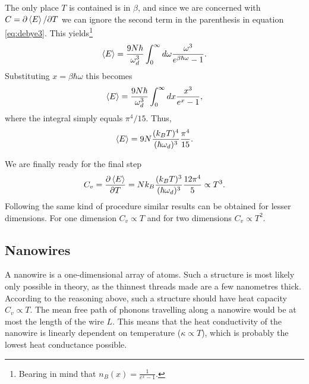 \documentclass[11pt]{amsart}
\begin{document}
The only place $T$ is contained is in $\beta$, and since we are concerned with $C = \partial\ev{E}/\partial T$ we can ignore the second term in the parenthesis in equation \ref{eq:debye3}. This yields\footnote{Bearing in mind that $n_B(x)=\frac{1}{e^x-1}$.}
\begin{equation}
\ev{E} = \frac{9N\hbar}{\omega_d^3}\int_0^\infty d\omega \frac{\omega^3}{e^{\beta\hbar\omega}-1}.
\end{equation}
Substituting $x = \beta\hbar\omega$ this becomes
\begin{equation}
\ev{E} = \frac{9N\hbar}{\omega_d^3}\int_0^\infty dx \frac{x^3}{e^x-1},
\end{equation}
where the integral simply equals $\pi^4/15$. Thus,
\begin{equation}
\ev{E} = 9N\frac{(k_BT)^4}{(\hbar\omega_d)^3}\frac{\pi^4}{15}.
\end{equation}

We are finally ready for the final step
\begin{equation}
C_v = \frac{\partial \ev{E}}{\partial T} = Nk_B \frac{(k_BT)^3}{(\hbar\omega_d)^3}\frac{12\pi^4}{5} \propto T^3.
\end{equation}
Following the same kind of procedure similar results can be obtained for lesser dimensions. For one dimension $C_v \propto T$ and for two dimensions $C_v \propto T^2$.

\subsection*{Nanowires}
A nanowire is a one-dimensional array of atoms. Such a structure is most likely only possible in theory, as the thinnest threads made are a few nanometres thick. According to the reasoning above, such a structure should have heat capacity $C_v \propto T$. The mean free path of phonons travelling along a nanowire would be at most the length of the wire $L$. This means that the heat conductivity of the nanowire is linearly dependent on temperature ($\kappa \propto T$), which is probably the lowest heat conductance possible. 
\end{document}
